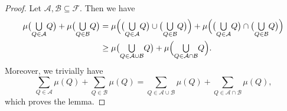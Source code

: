 \documentclass[10pt,a4paper]{amsart}
\newcommand{\bcup}[1]{{\textstyle\bigcup\limits_{#1}}}
\newcommand{\hab}[1]{\bigl(#1\bigr)}
\newcommand{\has}[1]{\Bigl(#1\Bigr)}
\newcommand{\mc}{\mathcal}
\begin{document}
\begin{proof}
  Let $\mc{A},\mc{B} \subseteq \mc{F}$. Then we have
  \begin{align*}
    \mu\hab{\bcup{Q\in\mathcal{A}}Q} + \mu\hab{\bcup{Q\in\mathcal{B}}Q} &= \mu\has{\hab{\bcup{Q\in \mathcal{A}}Q}\cup \hab{\bcup{Q\in\mathcal{B}}Q}}+ \mu\has{\hab{\bcup{Q\in\mathcal{A}}Q} \cap \hab{\bcup{Q\in\mathcal{B}}Q}}
     \\ &\geq \mu\hab{\bcup{Q\in\mathcal{A}\cup \mathcal{B}}Q}+ \mu\has{{\bcup{Q\in\mathcal{A} \cap \mathcal{B}}Q}}.
  \end{align*}
  Moreover, we trivially have
  $$
  \sum_{Q \in \mc{A}} \mu(Q)+\sum_{Q \in \mc{B}} \mu(Q) = \sum_{Q \in \mc{A}\cup \mc{B}} \mu(Q)+\sum_{Q \in \mc{A}\cap \mc{B}} \mu(Q),
  $$
  which proves the lemma.
\end{proof}
\end{document}
